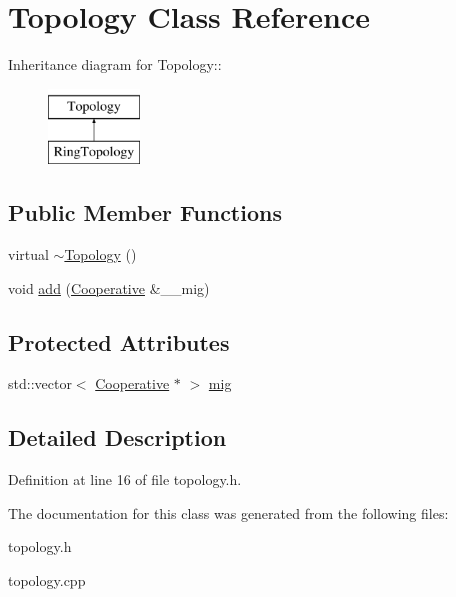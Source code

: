\hypertarget{classTopology}{
\section{Topology Class Reference}
\label{classTopology}
}
Inheritance diagram for Topology::\begin{figure}[H]
\begin{center}
\leavevmode
\includegraphics[height=2cm]{classTopology}
\end{center}
\end{figure}
\subsection*{Public Member Functions}
\begin{CompactItemize}
\item 
\hypertarget{classTopology_3e447669757c8311c7f6f8edc705abf2}{
virtual \hyperlink{classTopology_3e447669757c8311c7f6f8edc705abf2}{$\sim$Topology} ()}
\label{classTopology_3e447669757c8311c7f6f8edc705abf2}

\item 
\hypertarget{classTopology_62bc46d8c20fdc71dad9e7c7a0d7aded}{
void \hyperlink{classTopology_62bc46d8c20fdc71dad9e7c7a0d7aded}{add} (\hyperlink{classCooperative}{Cooperative} \&\_\-\_\-mig)}
\label{classTopology_62bc46d8c20fdc71dad9e7c7a0d7aded}

\end{CompactItemize}
\subsection*{Protected Attributes}
\begin{CompactItemize}
\item 
\hypertarget{classTopology_247a2faa8568b678f0b7b11e62c7812c}{
std::vector$<$ \hyperlink{classCooperative}{Cooperative} $\ast$ $>$ \hyperlink{classTopology_247a2faa8568b678f0b7b11e62c7812c}{mig}}
\label{classTopology_247a2faa8568b678f0b7b11e62c7812c}

\end{CompactItemize}


\subsection{Detailed Description}




Definition at line 16 of file topology.h.

The documentation for this class was generated from the following files:\begin{CompactItemize}
\item 
topology.h\item 
topology.cpp\end{CompactItemize}
